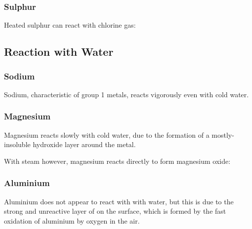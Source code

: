 
			\subsubsection{Sulphur}

				Heated sulphur can react with chlorine gas:





		\pagebreak
		\subsection{Reaction with Water}

			\subsubsection{Sodium}

				Sodium, characteristic of group 1 metals, reacts vigorously even with cold water.



			\subsubsection{Magnesium}

				Magnesium reacts slowly with cold water, due to the formation of a mostly-insoluble hydroxide layer around the metal.


				With steam however, magnesium reacts directly to form magnesium oxide:



			\subsubsection{Aluminium}

				Aluminium does not appear to react with with water, but this is due to the strong and unreactive layer of
				 on the surface, which is formed by the fast oxidation of aluminium by oxygen in the air.

